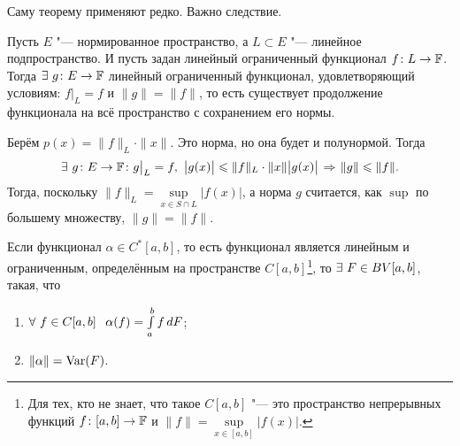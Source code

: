 Саму теорему применяют редко. Важно следствие.
\begin{Sl}
  Пусть $E$ "--- нормированное пространство, а $L\subset E$ "--- линейное подпространство. И пусть задан линейный ограниченный функционал $f\colon L\rightarrow\mathbb F$. Тогда $\exists\ g\colon E\rightarrow \mathbb F$ линейный ограниченный функционал, удовлетворяющий условиям: $f\big|_{L} = f$ и $\|g\| = \|f\|$, то есть существует продолжение функционала на всё пространство с сохранением его нормы.
\end{Sl}

\begin{Proof}
  Берём $p(x) =\|f\|_{L}\cdot \|x\|$. Это норма, но она будет и полунормой. Тогда 
\[
  \exists\ g\colon E\to\F\colon g\big|_L = f,\ \big|g(x)\big|\le \|f\|_L\cdot\|x\|\big|g(x)\big|\imp \|g\|\le \|f\|.
\]
Тогда, поскольку $\|f\|_L = \sup\limits_{x\in S\cap L}\big|f(x)\big|$, а норма $g$ считается, как $\sup$ по большему множеству, $\|g\| = \|f\|$.
\end{Proof}

\begin{The}[Рисса]
  Если функционал $\alpha\in C^*[a,b]$, то есть функционал является линейным и ограниченным, определённым на пространстве $C[a,b]$\footnote{Для тех, кто не знает, что такое $C[a,b]$ "--- это пространство непрерывных функций $f \colon [a,b]\rightarrow \mathbb F$ и $\|f\| = \sup\limits_{x\in[a,b]}\big|f(x)\big|$.}, то $\exists\ F\in \mathop{BV}[a,b]$, такая, что
\begin{enumerate}
  \item $\forall\ f\in C[a,b]\pau \alpha(f) = \int\limits_a^b f\,dF$;
  \item $\|\alpha\| = \operatorname{Var}(F)$.
\end{enumerate}
\end{The}

